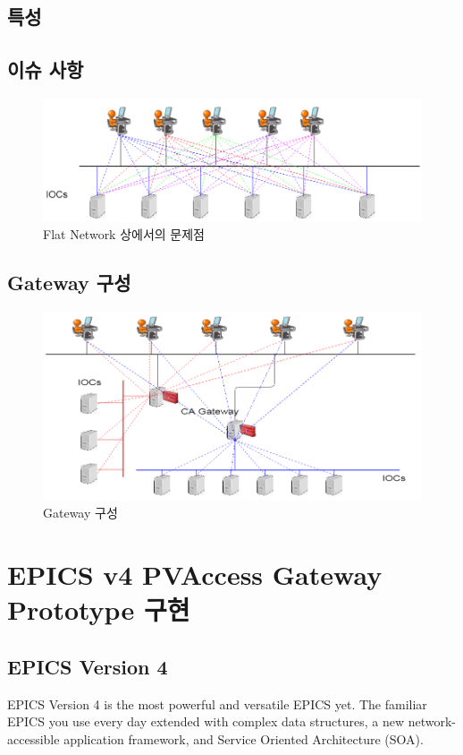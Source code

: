 \documentclass[11pt
  , a4paper
  , article
  , oneside
]{memoir}
\begin{document}
\section{특성}

\section{이슈 사항}

\begin{figure}[!htb]
	\centering
	\includegraphics[width=1\textwidth]{./images/flat_network.png}
	\caption{
		Flat Network 상에서의 문제점
	}
	\label{fig:flat_network}   
\end{figure}

\section{Gateway 구성}
\begin{figure}[!htb]
	\centering
	\includegraphics[width=1\textwidth]{./images/gateway.png}
	\caption{
		Gateway 구성
	}
	\label{fig:gateway}   
\end{figure}
\hfil\break

\chapter{EPICS v4 PVAccess Gateway Prototype 구현}
\section{EPICS Version 4}
EPICS Version 4 is the most powerful and versatile EPICS yet. The familiar EPICS you use every day extended with complex data structures, a new network-accessible application framework, and Service Oriented Architecture (SOA).
\end{document}
